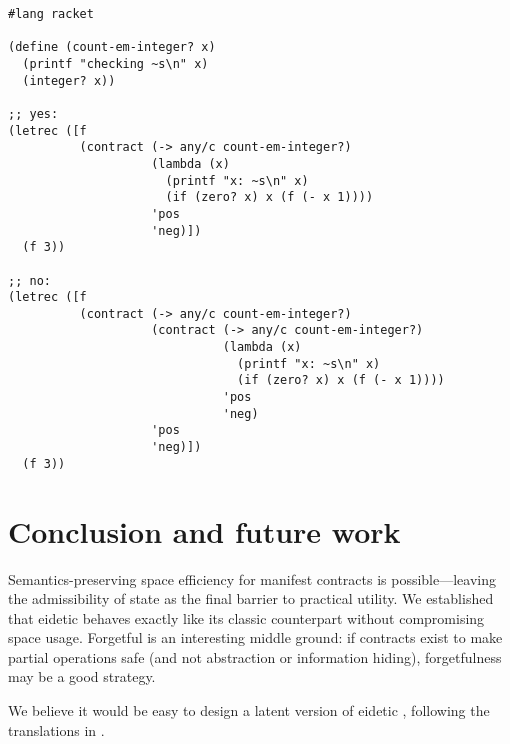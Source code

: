 \documentclass[9pt]{extarticle}
\begin{document}
{\iffull
{}

\begin{verbatim}
#lang racket

(define (count-em-integer? x)
  (printf "checking ~s\n" x)
  (integer? x))

;; yes:
(letrec ([f
          (contract (-> any/c count-em-integer?)
                    (lambda (x)
                      (printf "x: ~s\n" x)
                      (if (zero? x) x (f (- x 1))))
                    'pos
                    'neg)])
  (f 3))

;; no:
(letrec ([f
          (contract (-> any/c count-em-integer?)
                    (contract (-> any/c count-em-integer?)
                              (lambda (x)
                                (printf "x: ~s\n" x)
                                (if (zero? x) x (f (- x 1))))
                              'pos
                              'neg)
                    'pos
                    'neg)])
  (f 3))
\end{verbatim}
\fi}

\section{Conclusion and future work}
\label{sec:conclusion}

Semantics-preserving space efficiency for manifest contracts is
possible---leaving the admissibility of state as the final barrier to
practical utility. We established that eidetic \lambdah behaves
exactly like its classic counterpart without compromising space usage.
{\iffull Forgetful \lambdah is an interesting middle ground: if contracts exist
to make partial operations safe (and not abstraction or information
hiding), forgetfulness may be a good strategy. \fi}

We believe it would be easy to design a latent version of eidetic
\lambdah, following the translations in \citet{Greenberg10contracts}.
\end{document}
